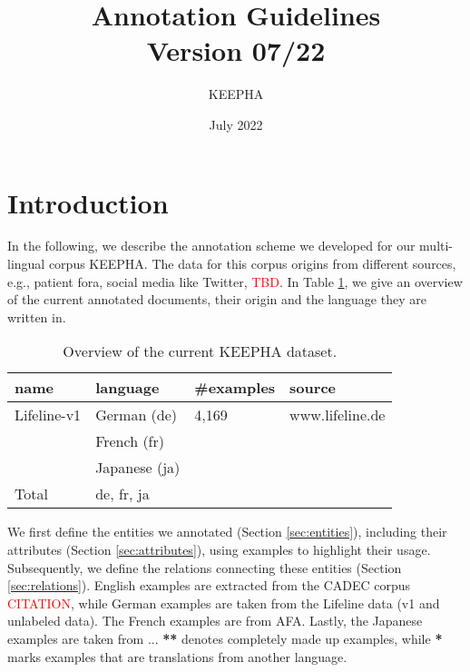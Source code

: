 \documentclass[12pt]{article}
\title{Annotation Guidelines\\ Version 07/22}
\author{KEEPHA}
\date{July 2022}
\theoremstyle{definition}
\begin{document}
\maketitle

\tableofcontents
\clearpage

\section{Introduction}
In the following, we describe the annotation scheme we developed for our multi-lingual corpus KEEPHA.
The data for this corpus origins from different sources, e.g., patient fora, social media like Twitter, \textcolor{red}{TBD}.
In Table \ref{tab:data}, we give an overview of the current annotated documents, their origin and the language they are written in.

\begin{table}[h]
\centering
\begin{tabular}{@{}llll@{}}
\toprule
\textbf{name}   & {\textbf{language}}   & \textbf{\#examples}   & \textbf{source} \\ \midrule

Lifeline-v1     &  German (de)          & 4,169                 &  www.lifeline.de \\ 

                & French (fr)           &                       &                   \\
                & Japanese (ja)         &                       &                   \\
\midrule

Total           & de, fr, ja            &                       & \\

\bottomrule
\end{tabular}
\caption{Overview of the current KEEPHA dataset.}
\label{tab:data}
\end{table}


\noindent We first define the entities we annotated (Section \ref{sec:entities}), including their attributes (Section \ref{sec:attributes}), using examples to highlight their usage.
Subsequently, we define the relations connecting these entities (Section \ref{sec:relations}).
English examples are extracted from the CADEC corpus \textcolor{red}{CITATION}, while German examples are taken from the Lifeline data (v1 and unlabeled data).
The French examples are from AFA.
Lastly, the Japanese examples are taken from ...
\textbf{**} denotes completely made up examples, while \textbf{*} marks examples that are translations from another language. 
\end{document}

